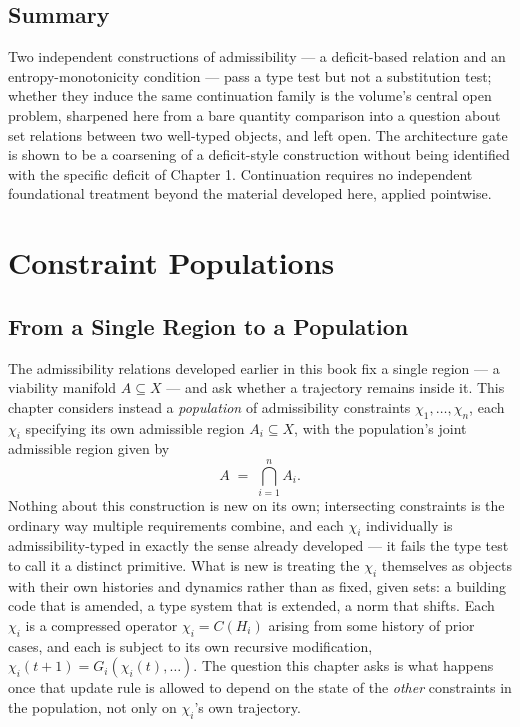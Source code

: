 \documentclass[12pt]{report}
\begin{document}
\section*{Summary}

Two independent constructions of admissibility --- a deficit-based
relation and an entropy-monotonicity condition --- pass a type test but
not a substitution test; whether they induce the same continuation
family is the volume's central open problem, sharpened here from a bare
quantity comparison into a question about set relations between two
well-typed objects, and left open. The architecture gate is shown to be
a coarsening of a deficit-style construction without being identified
with the specific deficit of Chapter 1. Continuation requires no
independent foundational treatment beyond the material developed here,
applied pointwise.

\chapter{Constraint Populations}

\section{From a Single Region to a Population}

The admissibility relations developed earlier in this book fix a single
region --- a viability manifold $A \subseteq X$ --- and ask whether a
trajectory remains inside it. This chapter considers instead a
\emph{population} of admissibility constraints $\chi_1, \ldots, \chi_n$,
each $\chi_i$ specifying its own admissible region $A_i \subseteq X$,
with the population's joint admissible region given by
\[
A \;=\; \bigcap_{i=1}^n A_i.
\]
Nothing about this construction is new on its own; intersecting
constraints is the ordinary way multiple requirements combine, and each
$\chi_i$ individually is admissibility-typed in exactly the sense already
developed --- it fails the type test to call it a distinct primitive.
What is new is treating the $\chi_i$ themselves as objects with their own
histories and dynamics rather than as fixed, given sets: a building code
that is amended, a type system that is extended, a norm that shifts. Each
$\chi_i$ is a compressed operator $\chi_i = C(H_i)$ arising from some
history of prior cases, and each is subject to its own recursive
modification, $\chi_i(t+1) = G_i(\chi_i(t), \ldots)$. The question this
chapter asks is what happens once that update rule is allowed to depend
on the state of the \emph{other} constraints in the population, not only
on $\chi_i$'s own trajectory.
\end{document}
